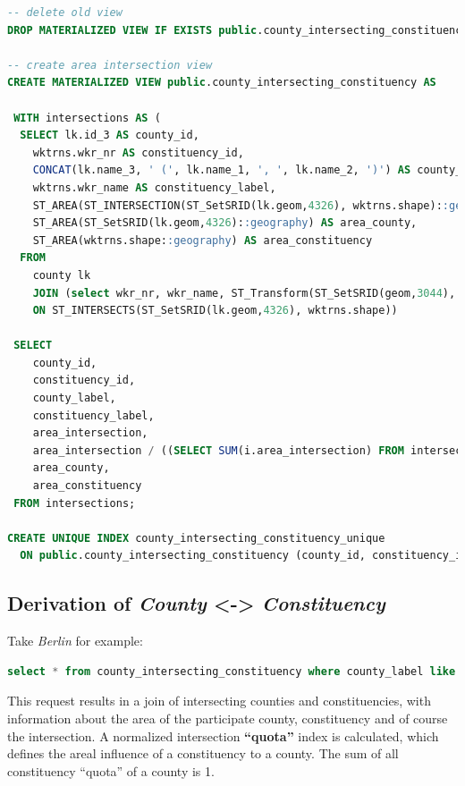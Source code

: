 \begin{lstlisting}[language=SQL]
-- delete old view
DROP MATERIALIZED VIEW IF EXISTS public.county_intersecting_constituency;

-- create area intersection view
CREATE MATERIALIZED VIEW public.county_intersecting_constituency AS 

 WITH intersections AS (
  SELECT lk.id_3 AS county_id,
	wktrns.wkr_nr AS constituency_id,
	CONCAT(lk.name_3, ' (', lk.name_1, ', ', lk.name_2, ')') AS county_label,
	wktrns.wkr_name AS constituency_label,
	ST_AREA(ST_INTERSECTION(ST_SetSRID(lk.geom,4326), wktrns.shape)::geography) AS area_intersection,
	ST_AREA(ST_SetSRID(lk.geom,4326)::geography) AS area_county,
	ST_AREA(wktrns.shape::geography) AS area_constituency
  FROM
	county lk
	JOIN (select wkr_nr, wkr_name, ST_Transform(ST_SetSRID(geom,3044), 4326) AS shape FROM constituency) AS wktrns
	ON ST_INTERSECTS(ST_SetSRID(lk.geom,4326), wktrns.shape))
	
 SELECT
	county_id,
	constituency_id,
	county_label,
	constituency_label,
	area_intersection,
	area_intersection / ((SELECT SUM(i.area_intersection) FROM intersections i WHERE i.county_id = intersections.county_id)) AS area_quota,
	area_county,
	area_constituency
 FROM intersections;

CREATE UNIQUE INDEX county_intersecting_constituency_unique
  ON public.county_intersecting_constituency (county_id, constituency_id);
\end{lstlisting}

\subsection{Derivation of \emph{County} \textless{}-\textgreater{}
\emph{Constituency}}\label{derivation-of-county---constituency}

Take \emph{Berlin} for example:

\begin{lstlisting}[language=SQL]
select * from county_intersecting_constituency where county_label like '%Berlin%' order by area_intersection;
\end{lstlisting}

This request results in a join of intersecting counties and
constituencies, with information about the area of the participate
county, constituency and of course the intersection. A normalized
intersection \textbf{``quota''} index is calculated, which defines the
areal influence of a constituency to a county. The sum of all
constituency ``quota'' of a county is 1.

